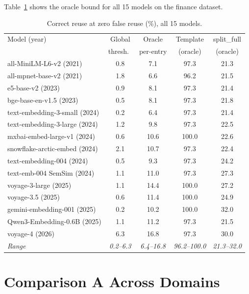 \documentclass[11pt,a4paper]{article}
\begin{document}
Table~\ref{tab:oracle-full} shows the oracle bound for all 15 models on
the finance dataset.

\begin{table}[h]
\centering
\caption{Correct reuse at zero false reuse (\%), all 15 models.}
\label{tab:oracle-full}
\small
\begin{tabular}{@{}lcccc@{}}
\toprule
Model (year) & Global & Oracle & Template & split\_full \\
             & thresh.\ & per-entry & (oracle) & (oracle) \\
\midrule
all-MiniLM-L6-v2 (2021)           & 0.8 &  7.1 & 97.3 & 21.3 \\
all-mpnet-base-v2 (2021)           & 1.8 &  6.6 & 96.2 & 21.5 \\
e5-base-v2 (2023)                  & 0.9 &  8.1 & 97.3 & 21.4 \\
bge-base-en-v1.5 (2023)            & 0.5 &  8.1 & 97.3 & 21.8 \\
text-embedding-3-small (2024)      & 0.2 &  6.4 & 97.3 & 21.4 \\
text-embedding-3-large (2024)      & 1.2 &  9.8 & 97.3 & 22.5 \\
mxbai-embed-large-v1 (2024)        & 0.6 & 10.6 & 100.0 & 22.6 \\
snowflake-arctic-embed (2024)      & 2.1 & 10.7 & 97.3 & 22.4 \\
text-embedding-004 (2024)          & 0.5 &  9.3 & 97.3 & 24.2 \\
text-emb-004 SemSim (2024)         & 1.1 & 11.0 & 97.3 & 27.3 \\
voyage-3-large (2025)              & 1.1 & 14.4 & 100.0 & 27.2 \\
voyage-3.5 (2025)                  & 0.6 & 11.4 & 100.0 & 24.9 \\
gemini-embedding-001 (2025)        & 0.2 & 10.2 & 100.0 & 32.0 \\
Qwen3-Embedding-0.6B (2025)        & 1.1 & 11.2 & 97.3 & 21.5 \\
voyage-4 (2026)                    & 6.3 & 16.8 & 97.3 & 30.0 \\
\midrule
\textit{Range} & \textit{0.2--6.3} & \textit{6.4--16.8}
               & \textit{96.2--100.0} & \textit{21.3--32.0} \\
\bottomrule
\end{tabular}
\end{table}

\section{Comparison A Across Domains}
\label{app:comp-a}
\end{document}
